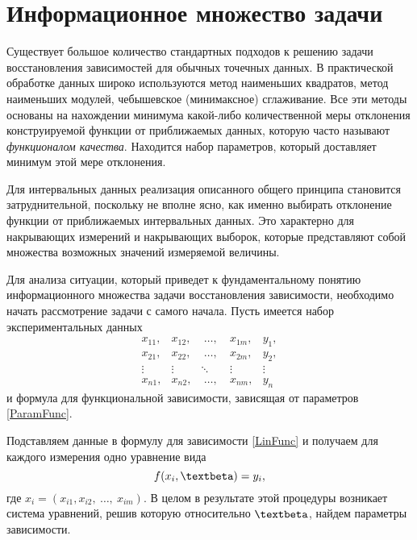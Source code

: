 \documentclass[a5paper,openany]{book}
\renewcommand{\beta}{\text{\textbeta}}
\begin{document}
\section{Информационное множество задачи} 
\label{InformSetSect} 


Существует большое количество стандартных подходов к решению задачи 
восстановления зависимостей для обычных точечных данных. В практической обработке данных широко используются метод наименьших квадратов, метод наименьших модулей, чебышевское (минимаксное) сглаживание. Все эти методы основаны 
на  нахождении минимума какой-либо количественной меры отклонения конструируемой 
функции от приближаемых данных, которую часто называют \emph{функционалом качества}. 
 Находится набор параметров, который доставляет минимум этой 
мере отклонения.  

Для интервальных данных реализация описанного общего принципа становится 
затруднительной, поскольку не вполне ясно, как именно выбирать отклонение функции 
от приближаемых интервальных данных. Это характерно для накрывающих 
измерений и накрывающих выборок, которые представляют собой множества возможных 
значений измеряемой величины. 

Для анализа ситуации, который 
приведет  к фундаментальному понятию информационного множества задачи восстановления 
зависимости, необходимо начать рассмотрение задачи с самого начала. 
Пусть имеется набор экспериментальных данных 
\begin{equation} 
	\label{EmpReData} 
	\begin{array}{ccccc} 
		x_{11}, & x_{12}, & \ \ldots, \ & x_{1m}, & y_{1}, \\ 
		x_{21}, & x_{22}, & \ \ldots, \ & x_{2m}, & y_{2}, \\ 
		\vdots  & \vdots  & \ddots &  \vdots & \vdots \\ 
		x_{n1}, & x_{n2}, & \ \ldots, \ & x_{nm}, & y_{n} 
	\end{array}
\end{equation} 
и формула для функциональной зависимости, зависящая от параметров \eqref{ParamFunc}. 

Подставляем данные в формулу для зависимости \eqref{LinFunc} и получаем для каждого 
измерения одно уравнение вида 
\begin{equation*} 
	f( x_{i}, \beta) = y_{i},  
\end{equation*} 
где $x_i = (x_{i1}, x_{i2}, \ \ldots, \ x_{im})$. В целом в результате этой процедуры 
возникает система уравнений, решив которую относительно $\beta$, найдем параметры зависимости. 
\end{document}
